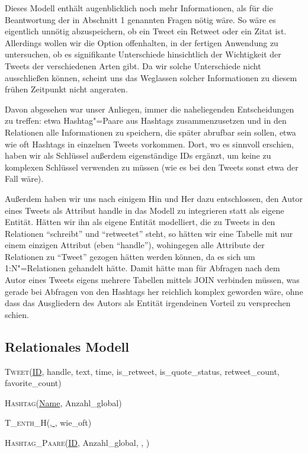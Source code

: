 \documentclass[BCOR0mm,fontsize=12pt,paper=a4,final,numbers=noenddot]{scrartcl}
\begin{document}
\noindent{}Dieses Modell enthält augenblicklich noch mehr Informationen, als für die Beantwortung der in Abschnitt 1 genannten Fragen nötig wäre. So wäre es eigentlich unnötig abzuspeichern, ob ein Tweet ein Retweet oder ein Zitat ist. Allerdings wollen wir die Option offenhalten, in der fertigen Anwendung zu untersuchen, ob es signifikante Unterschiede hinsichtlich der Wichtigkeit der Tweets der verschiedenen Arten gibt. Da wir solche Unterschiede nicht ausschließen können, scheint uns das Weglassen solcher Informationen zu diesem frühen Zeitpunkt nicht angeraten.

Davon abgesehen war unser Anliegen, immer die naheliegenden Entscheidungen zu treffen: etwa Hashtag"=Paare aus Hashtags zusammenzusetzen und in den Relationen alle Informationen zu speichern, die später abrufbar sein sollen, etwa wie oft Hashtags in einzelnen Tweets vorkommen. Dort, wo es sinnvoll erschien, haben wir als Schlüssel außerdem eigenständige IDs ergänzt, um keine zu komplexen Schlüssel verwenden zu müssen (wie es bei den Tweets sonst etwa der Fall wäre).

Außerdem haben wir uns nach einigem Hin und Her dazu entschlossen, den Autor eines Tweets als Attribut handle in das Modell zu integrieren statt als eigene Entität. Hätten wir ihn als eigene Entität modelliert, die zu Tweets in den Relationen "`schreibt"' und "`retweetet"' steht, so hätten wir eine Tabelle mit nur einem einzigen Attribut (eben "`handle"'), wohingegen alle Attribute der Relationen zu "`Tweet"' gezogen hätten werden können, da es sich um 1:N"=Relationen gehandelt hätte. Damit hätte man für Abfragen nach dem Autor eines Tweets eigens mehrere Tabellen mittels JOIN verbinden müssen, was gerade bei Abfragen von den Hashtags her reichlich komplex geworden wäre, ohne dass das Ausgliedern des Autors als Entität irgendeinen Vorteil zu versprechen schien.


\subsection{Relationales Modell}

\noindent\textsc{Tweet}(\uline{ID}, handle, text, time, is\_retweet, is\_quote\_status, retweet\_count, favorite\_count)

\noindent\textsc{Hashtag}(\uline{Name}, Anzahl\_global)

\noindent\textsc{T\_enth\_H}(\uline{, }, wie\_oft)

\noindent\textsc{Hashtag\_Paare}(\uline{ID}, Anzahl\_global, , )
\end{document}
